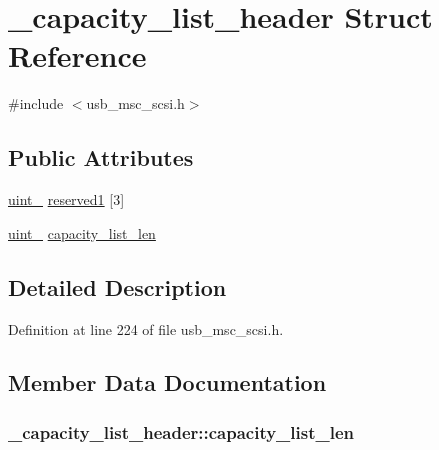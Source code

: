 \hypertarget{struct__capacity__list__header}{}\section{\+\_\+capacity\+\_\+list\+\_\+header Struct Reference}
\label{struct__capacity__list__header}


{\ttfamily \#include $<$usb\+\_\+msc\+\_\+scsi.\+h$>$}

\subsection*{Public Attributes}
\begin{DoxyCompactItemize}
\item 
\hyperlink{types_8h_ad3209046c23f739a81581c10a4be7d92}{uint\+\_} \hyperlink{struct__capacity__list__header_a08fab2ca6acf1044c6f6d4ef700fd8a4}{reserved1} \mbox{[}3\mbox{]}
\item 
\hyperlink{types_8h_ad3209046c23f739a81581c10a4be7d92}{uint\+\_} \hyperlink{struct__capacity__list__header_a934fa15d57630a3df0f9d7ce9d7eb003}{capacity\+\_\+list\+\_\+len}
\end{DoxyCompactItemize}


\subsection{Detailed Description}


Definition at line 224 of file usb\+\_\+msc\+\_\+scsi.\+h.



\subsection{Member Data Documentation}
\subsubsection[{\texorpdfstring{capacity\+\_\+list\+\_\+len}{capacity_list_len}}]{ \+\_\+capacity\+\_\+list\+\_\+header\+::capacity\+\_\+list\+\_\+len}\hypertarget{struct__capacity__list__header_a934fa15d57630a3df0f9d7ce9d7eb003}{}\label{struct__capacity__list__header_a934fa15d57630a3df0f9d7ce9d7eb003}


